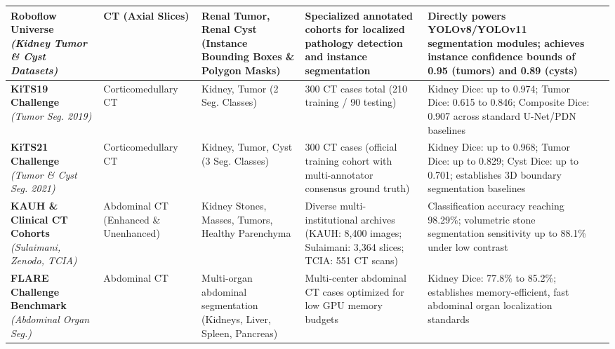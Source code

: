 \begin{small}
\begin{longtable}{p{2.5cm} p{2.0cm} p{2.5cm} p{3.0cm} p{3.6cm} p{2.2cm}}
\textbf{Roboflow Universe}\newline
\textit{(Kidney Tumor \& Cyst Datasets)} & 
CT (Axial Slices) & 
Renal Tumor, Renal Cyst (Instance Bounding Boxes \& Polygon Masks) & 
Specialized annotated cohorts for localized pathology detection and instance segmentation & 
Directly powers YOLOv8/YOLOv11 segmentation modules; achieves instance confidence bounds of 0.95 (tumors) and 0.89 (cysts) & 
\cite{dataset_roboflow_tumor, dataset_roboflow_cyst} \\
\midrule

\textbf{KiTS19 Challenge}\newline
\textit{(Tumor Seg. 2019)} & 
Corticomedullary CT & 
Kidney, Tumor (2 Seg. Classes) & 
300 CT cases total\newline
(210 training / 90 testing) & 
Kidney Dice: up to 0.974; Tumor Dice: 0.615 to 0.846; Composite Dice: 0.907 across standard U-Net/PDN baselines & 
\cite{ji2024kits, hatsutani2023segmentation, abdelrahman2023efficientnet} \\
\midrule

\textbf{KiTS21 Challenge}\newline
\textit{(Tumor \& Cyst Seg. 2021)} & 
Corticomedullary CT & 
Kidney, Tumor, Cyst (3 Seg. Classes) & 
300 CT cases (official training cohort with multi-annotator consensus ground truth) & 
Kidney Dice: up to 0.968; Tumor Dice: up to 0.829; Cyst Dice: up to 0.701; establishes 3D boundary segmentation baselines & 
\cite{heller2023kits21, zhao2023automatic, chen20215d, gohil2024kits} \\
\midrule

\textbf{KAUH \& Clinical CT Cohorts}\newline
\textit{(Sulaimani, Zenodo, TCIA)} & 
Abdominal CT (Enhanced \& Unenhanced) & 
Kidney Stones, Masses, Tumors, Healthy Parenchyma & 
Diverse multi-institutional archives (KAUH: 8,400 images; Sulaimani: 3,364 slices; TCIA: 551 CT scans) & 
Classification accuracy reaching 98.29\%; volumetric stone segmentation sensitivity up to 88.1\% under low contrast & 
\cite{aljohani2025clinical, alzubi2022kidney, abdalla2025kidney, elton2022deep} \\
\midrule

\textbf{FLARE Challenge Benchmark}\newline
\textit{(Abdominal Organ Seg.)} & 
Abdominal CT & 
Multi-organ abdominal segmentation (Kidneys, Liver, Spleen, Pancreas) & 
Multi-center abdominal CT cases optimized for low GPU memory budgets & 
Kidney Dice: 77.8\% to 85.2\%; establishes memory-efficient, fast abdominal organ localization standards & 
\cite{ma2022fast} \\
\midrule


\end{longtable}
\end{small}
